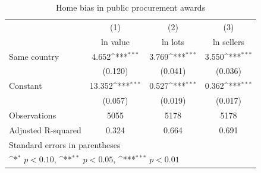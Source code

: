\begin{table}[htbp]\centering
\def\sym#1{\ifmmode^{#1}\else\(^{#1}\)\fi}
\caption{Home bias in public procurement awards}
\begin{tabular}{l*{3}{c}}
\hline\hline
                    &\multicolumn{1}{c}{(1)}&\multicolumn{1}{c}{(2)}&\multicolumn{1}{c}{(3)}\\
                    &\multicolumn{1}{c}{ln value}&\multicolumn{1}{c}{ln lots}&\multicolumn{1}{c}{ln sellers}\\
\hline
Same country        &       4.652\sym{***}&       3.769\sym{***}&       3.550\sym{***}\\
                    &     (0.120)         &     (0.041)         &     (0.036)         \\
[1em]
Constant            &      13.352\sym{***}&       0.527\sym{***}&       0.362\sym{***}\\
                    &     (0.057)         &     (0.019)         &     (0.017)         \\
\hline
Observations        &        5055         &        5178         &        5178         \\
Adjusted R-squared  &       0.324         &       0.664         &       0.691         \\
\hline\hline
\multicolumn{4}{l}{\footnotesize Standard errors in parentheses}\\
\multicolumn{4}{l}{\footnotesize \sym{*} \(p<0.10\), \sym{**} \(p<0.05\), \sym{***} \(p<0.01\)}\\
\end{tabular}
\end{table}
